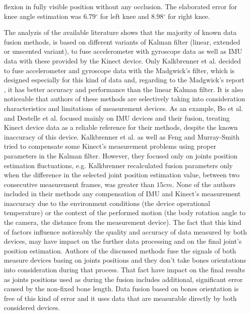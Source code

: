 \documentclass[sensors,article,submit,moreauthors,pdftex,10pt,a4paper]{mdpi}
\newcommand{\degree}{\ensuremath{{}^{\circ}}\xspace}
\begin{document}
flexion in fully visible position without any occlusion. The elaborated error for knee angle estimation was $6.79\degree$ for left knee and $8.98\degree$ for right knee.

The analyzis of the available literature shows that the majority of known data fusion methods, is based on different variants of Kalman filter (linear, extended or unscented variant), to fuse accelerometer with gyroscope data as well as IMU data with these provided by the Kinect device. Only Kalkbrenner et al. decided to fuse accelerometer and gyroscope data with the Madgwick's filter, which is designed especially for this kind of data and, regarding to the Madgwick's report \cite{Madgwick2011}, it has better accuracy and performance than the linear Kalman filter. It is also noticeable that authors of these methods are selectively taking into consideration characteristics and limitations of measurement devices. As an example, Bo et al. \cite{Bo2011a} and Destelle et al. \cite{Destelle2014} focused mainly on IMU devices and their fusion, treating Kinect device data as a reliable reference for their methods, despite the known inaccuracy of this device. Kalkbrenner et al.\cite{Kalkbrenner2014} as well as Feng and Murray-Smith\cite{Murray-Smith2014} tried to compensate some Kinect's measurement problems using proper parameters in the Kalman filter. However, they focused only on joints position estimation fluctuations, e.g. Kalkbrenner recalculated fusion parameters only when the difference in the selected joint position estimation value, between two consecutive measurement frames, was greater than $15cm$. None of the authors included in their methods any compensation of IMU and Kinect's measurement inaccuracy due to the environment conditions (the device operational temperature) or the context of the performed motion (the body rotation angle to the camera, the distance from the measurement device). The fact that this kind of factors influence noticeably the quality and accuracy of data measured by both devices, may have impact on the further data processing and on the final joint's position estimation. Authors of the discussed methods fuse the signals of both measure devices basing on joints positions and they don't take bones orientations into consideration during that process. That fact have impact on the final results as joints positions used as during the fusion includes additional, significant error caused by the non-fixed bone length. Data fusion based on bones orientation is free of this kind of error and it uses data that are measurable directly by both considered devices.
\end{document}
